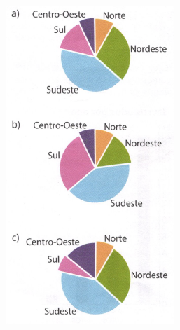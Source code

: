 \documentclass[a4paper,14pt]{article}
\begin{document}
\begin{multicols}{2}
\begin{enumerate}
			\includegraphics[width=1\linewidth]{6FMA119_imagens/imagem15}
			\\

\end{enumerate}
\end{multicols}
\end{document}
